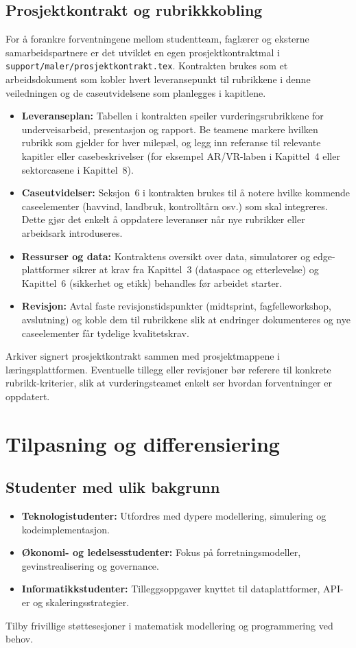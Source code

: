 \subsection{Prosjektkontrakt og rubrikkkobling}
For å forankre forventningene mellom studentteam, faglærer og eksterne samarbeidspartnere er det utviklet en egen prosjektkontraktmal i \texttt{support/maler/prosjektkontrakt.tex}. Kontrakten brukes som et arbeidsdokument som kobler hvert leveransepunkt til rubrikkene i denne veiledningen og de caseutvidelsene som planlegges i kapitlene.
\begin{itemize}
    \item \textbf{Leveranseplan:} Tabellen i kontrakten speiler vurderingsrubrikkene for underveisarbeid, presentasjon og rapport. Be teamene markere hvilken rubrikk som gjelder for hver milepæl, og legg inn referanse til relevante kapitler eller casebeskrivelser (for eksempel AR/VR-laben i Kapittel~4 eller sektorcasene i Kapittel~8).
    \item \textbf{Caseutvidelser:} Seksjon~6 i kontrakten brukes til å notere hvilke kommende caseelementer (havvind, landbruk, kontrolltårn osv.) som skal integreres. Dette gjør det enkelt å oppdatere leveranser når nye rubrikker eller arbeidsark introduseres.
    \item \textbf{Ressurser og data:} Kontraktens oversikt over data, simulatorer og edge-plattformer sikrer at krav fra Kapittel~3 (dataspace og etterlevelse) og Kapittel~6 (sikkerhet og etikk) behandles før arbeidet starter.
    \item \textbf{Revisjon:} Avtal faste revisjonstidspunkter (midtsprint, fagfelleworkshop, avslutning) og koble dem til rubrikkene slik at endringer dokumenteres og nye caseelementer får tydelige kvalitetskrav.
\end{itemize}
Arkiver signert prosjektkontrakt sammen med prosjektmappene i læringsplattformen. Eventuelle tillegg eller revisjoner bør referere til konkrete rubrikk-kriterier, slik at vurderingsteamet enkelt ser hvordan forventninger er oppdatert.

\section{Tilpasning og differensiering}
\subsection{Studenter med ulik bakgrunn}
\begin{itemize}
    \item \textbf{Teknologistudenter:} Utfordres med dypere modellering, simulering og kodeimplementasjon.
    \item \textbf{Økonomi- og ledelsesstudenter:} Fokus på forretningsmodeller, gevinstrealisering og governance.
    \item \textbf{Informatikkstudenter:} Tilleggsoppgaver knyttet til dataplattformer, API-er og skaleringsstrategier.
\end{itemize}
Tilby frivillige støttesesjoner i matematisk modellering og programmering ved behov.

